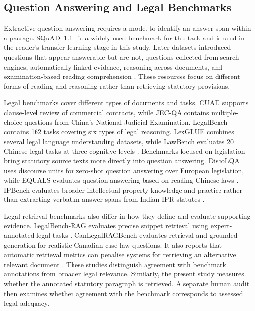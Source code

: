 \documentclass[pdflatex,sn-basic]{sn-jnl}%
\theoremstyle{thmstyleone}%
\theoremstyle{thmstyletwo}%
\theoremstyle{thmstylethree}%
\begin{document}
\subsection{Question Answering and Legal Benchmarks}

Extractive question answering requires a model to identify an answer span
within a passage. SQuAD~1.1~\citep{rajpurkarSQuAD100000Questions2016} is a
widely used benchmark for this task and is used in the reader's transfer
learning stage in this study. Later datasets introduced questions that appear
answerable but are not, questions collected from search engines, automatically
linked evidence, reasoning across documents, and examination-based reading
comprehension
\citep{rajpurkarKnowWhatYou2018,kwiatkowskiNaturalQuestionsBenchmark2019,
joshiTriviaQALargeScale2017,yangHotpotQADatasetDiverse2018,
laiRACELargescaleReAding2017}. These resources focus on different forms of
reading and reasoning rather than retrieving statutory provisions.

Legal benchmarks cover different types of documents and tasks. CUAD
\citep{hendrycksCUADExpertAnnotatedNLP2021} supports clause-level review of
commercial contracts, while JEC-QA
\citep{zhongJECQALegalDomainQuestion2020} contains multiple-choice questions
from China's National Judicial Examination. LegalBench contains 162 tasks
covering six types of legal reasoning. LexGLUE combines several legal language
understanding datasets, while LawBench evaluates 20 Chinese legal tasks at
three cognitive levels
\citep{guha2023legalbench,chalkidisLexGLUEBenchmarkDataset2022,
feiLawBenchBenchmarkingLegal2024}. Benchmarks focused on legislation bring
statutory source texts more directly into question answering. DiscoLQA uses
discourse units for zero-shot question answering over European legislation,
while EQUALS evaluates question answering based on reading Chinese laws
\citep{sovrano2025discolqa,chen2023equals}. IPBench evaluates broader
intellectual property knowledge and practice rather than extracting verbatim
answer spans from Indian IPR statutes
\citep{wangIPBenchBenchmarkingKnowledge2025}.

Legal retrieval benchmarks also differ in how they define and evaluate
supporting evidence. LegalBench-RAG evaluates precise snippet retrieval using
expert-annotated legal tasks \citep{pipitone2024legalbenchrag}.
CanLegalRAGBench evaluates retrieval and grounded generation for realistic
Canadian case-law questions. It also reports that automatic retrieval metrics
can penalise systems for retrieving an alternative relevant document
\citep{zhao2026canlegalragbench}. These studies distinguish agreement with
benchmark annotations from broader legal relevance. Similarly, the present
study measures whether the annotated statutory paragraph is retrieved. A
separate human audit then examines whether agreement with the benchmark
corresponds to assessed legal adequacy.
\end{document}
